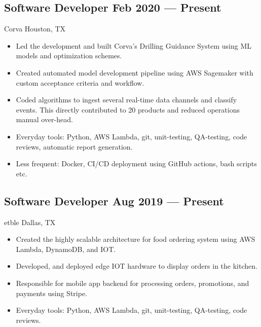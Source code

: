 \documentclass[letter,10pt]{article}
\newcommand{\subtext}[1]{
	#1\par\vspace{-0.2cm}}
\newenvironment{zitemize}{
	\begin{itemize}\itemsep0pt \parskip0pt \parsep1pt}
	{\end{itemize}\vspace{-0.5cm}}
\begin{document}
	\subsection*{Software Developer \hfill Feb 2020 --- Present} 
	\subtext{Corva \hfill Houston, TX} 
	\begin{zitemize}
		\item Led the development and built Corva's Drilling Guidance System using ML models and optimization schemes.
		\item Created automated model development pipeline using AWS Sagemaker with custom acceptance criteria and workflow.
		\item Coded algorithms to ingest several real-time data channels and classify events. This directly contributed to 20 products and reduced operations manual over-head.
		\item Everyday tools: Python, AWS Lambda, git, unit-testing, QA-testing, code reviews, automatic report generation.
		\item Less frequent: Docker, CI/CD deployment using GitHub actions, bash scripts etc.
	\end{zitemize}
	
	\vspace{0.3 cm}
	\subsection*{Software Developer \hfill Aug 2019 --- Present} 
	\subtext{etble \hfill Dallas, TX} 
	\begin{zitemize}
		\item Created the highly scalable architecture for food ordering system using AWS Lambda, DynamoDB, and IOT.
		\item Developed, and deployed edge IOT hardware to display orders in the kitchen.
		\item Responsible for mobile app backend for processing orders, promotions, and payments using Stripe.
		\item Everyday tools: Python, AWS Lambda, git, unit-testing, QA-testing, code reviews.
	\end{zitemize}

	\vspace{0.3 cm}
\end{document}

